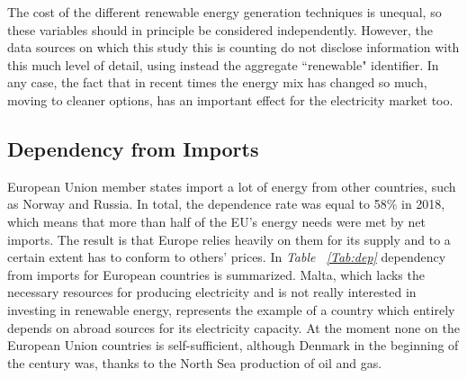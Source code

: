 \documentclass[a4paper,12pt]{book}
\begin{document}
The cost of the different renewable energy generation techniques is unequal, so these variables should in principle be considered independently. However, the data sources on which this study this is counting do not disclose information with this much level of detail, using instead the aggregate ``renewable" identifier. In any case, the fact that in recent times the energy mix has changed so much, moving to cleaner options, has an important effect for the electricity market too.

\subsection{Dependency from Imports}

European Union member states import a lot of energy from other countries, such as Norway and Russia. In total, the dependence rate was equal to 58\% in 2018, which means that more than half of the EU’s energy needs were met by net imports. The result is that Europe relies heavily on them for its supply and to a certain extent has to conform to others' prices. In \textit{Table ~\ref{Tab:dep}} dependency from imports for European countries is summarized. Malta, which lacks the necessary resources for producing electricity and is not really interested in investing in renewable energy, represents the example of a country which entirely depends on abroad sources for its electricity capacity. At the moment none on the European Union countries is self-sufficient, although Denmark in the beginning of the century was, thanks to the North Sea production of oil and gas.
\end{document}
